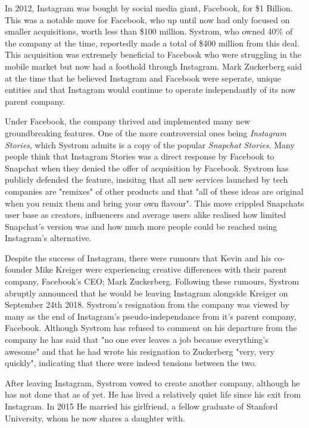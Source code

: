 \documentclass[12pt]{article}
\begin{document}
    In 2012, Instagram was bought by social media giant, Facebook, for \$1 Billion. This was a notable move for Facebook, who up until now had only focused on smaller acquisitions,
    worth less than \$100 million.
    Systrom, who owned 40\% of the company at the time,
    reportedly made a total of \$400 million from this deal. This acquisition was extremely beneficial to Facebook who were 
    struggling in the mobile market but now had a foothold through Instagram. 
    Mark Zuckerberg said at the time that he believed Instagram and Facebook were seperate, unique entities 
    and that Instagram would continue to operate independantly of its now parent company.

    Under Facebook, the company thrived and implemented many new groundbreaking features. One of the more controversial ones being \textit{Instagram Stories}, which Systrom admits is a copy of the
    popular \textit{Snapchat Stories}. Many people think that Instagram Stories was a direct response by Facebook to Snapchat when they denied the offer of acquisition by Facebook.
    Systrom has publicly defended the feature, insisitng that all new services launched by tech companies are "remixes" of other products and that
    "all of these ideas are original when you remix them and bring your own flavour". This move crippled Snapchats user base as creators, influencers and average users alike realised how limited
    Snapchat's version was and how much more people could be reached using Instagram's alternative. 

    Despite the success of Instagram, there were rumours that 
    Kevin and his co-founder Mike Kreiger were experiencing 
    creative differences with their parent company, Facebook's CEO; Mark Zuckerberg. Following these rumours, Systrom abruptly
    announced that he would be leaving Instagram alongside Kreiger on September 24th 2018. Systrom's resignation from the company was viewed 
    by many as the end of Instagram's pseudo-independance from it's parent company, Facebook.
    Although Systrom has refused to comment on his departure from the company he has said that "no one ever leaves a job because everything's awesome"
    and that he had wrote his resignation to Zuckerberg "very, very quickly", indicating that there were indeed tensions between the two.
    
    After leaving Instagram, Systrom vowed to create another company, although he has not done that as of yet. He 
    has lived a relatively quiet life since his exit from Instagram. In 2015 He married his girlfriend, 
    a fellow graduate of Stanford University, whom he now shares a daughter with.
    
\end{document}
